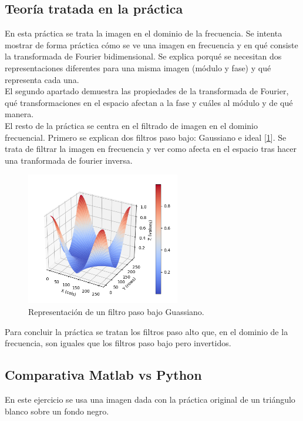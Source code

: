\documentclass[a4paper,12pt]{report}
\begin{document}
\subsection{Teoría tratada en la práctica}

En esta práctica se trata la imagen en el dominio de la frecuencia. Se intenta mostrar de forma práctica cómo se ve una imagen en frecuencia y en qué consiste la transformada de Fourier bidimensional. Se explica porqué se necesitan dos representaciones diferentes para una misma imagen (módulo y fase) y qué representa cada una.\\

El segundo apartado demuestra las propiedades de la transformada de Fourier, qué transformaciones en el espacio afectan a la fase y cuáles al módulo y de qué manera.\\

El resto de la práctica se centra en el filtrado de imagen en el dominio frecuencial. Primero se explican dos filtros paso bajo: Gaussiano e ideal [\ref {gauss}]. Se trata de filtrar la imagen en frecuencia y ver como afecta en el espacio tras hacer una tranformada de fourier inversa.
\begin{figure}[h]
\centering
\includegraphics[width=0.6\textwidth]{imagenes/gaussfpb}
\caption{Representación de un filtro paso bajo Guassiano.}
\label{gauss}
\end{figure}
 Para concluir la práctica se tratan los filtros paso alto que, en el dominio de la frecuencia, son iguales que los filtros paso bajo pero invertidos.
\subsection{Comparativa Matlab vs Python}

En este ejercicio se usa una imagen dada con la práctica original de un triángulo blanco sobre un fondo negro.\\
\end{document}
